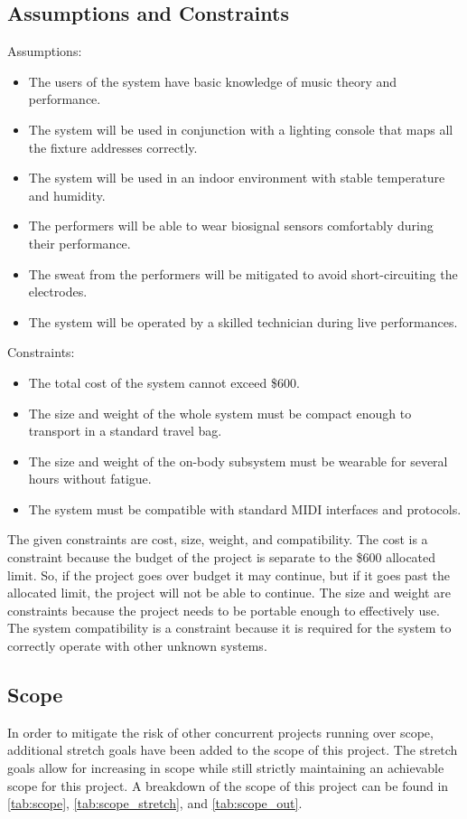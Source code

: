 \subsection{Assumptions and Constraints}
Assumptions:
\begin{itemize}
    \item The users of the system have basic knowledge of music theory and performance.
    \item The system will be used in conjunction with a lighting console that maps all the fixture addresses correctly.
    \item The system will be used in an indoor environment with stable temperature and humidity.
    \item The performers will be able to wear biosignal sensors comfortably during their performance.
    \item The sweat from the performers will be mitigated to avoid short-circuiting the electrodes.
    \item The system will be operated by a skilled technician during live performances.
\end{itemize}

Constraints:
\begin{itemize}
    \item The total cost of the system cannot exceed \$600.
    \item The size and weight of the whole system must be compact enough to transport in a standard travel bag.
    \item The size and weight of the on-body subsystem must be wearable for several hours without fatigue.
    \item The system must be compatible with standard MIDI interfaces and protocols.
\end{itemize}

The given constraints are cost, size, weight, and compatibility.
The cost is a constraint because the budget of the project is separate to the \$600 allocated limit.
So, if the project goes over budget it may continue, but if it goes past the allocated limit, the project will not be able to continue.
The size and weight are constraints because the project needs to be portable enough to effectively use.
The system compatibility is a constraint because it is required for the system to correctly operate with other unknown systems.

\subsection{Scope}
In order to mitigate the risk of other concurrent projects running over scope, additional stretch goals have
been added to the scope of this project. The stretch goals allow for increasing in scope
while still strictly maintaining an achievable scope for this project.
A breakdown of the scope of this project can be found in \autoref{tab:scope}, \autoref{tab:scope_stretch}, and \autoref{tab:scope_out}.

